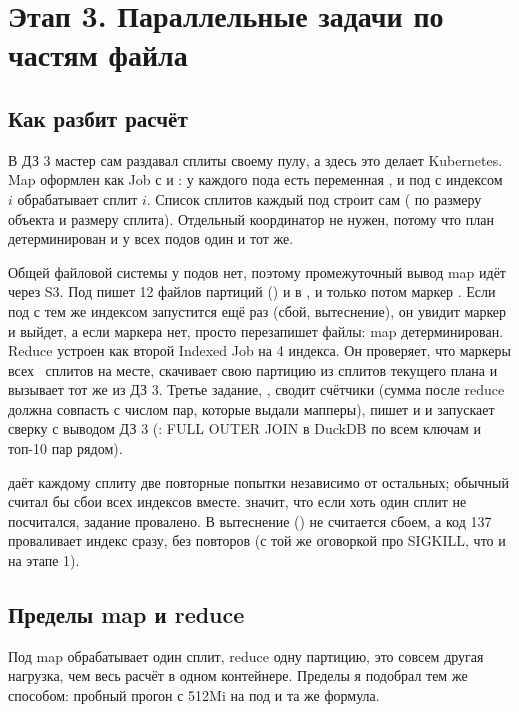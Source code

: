 \section{Этап 3. Параллельные задачи по частям файла}\label{sec:parallel}

\subsection{Как разбит расчёт}
В ДЗ 3 мастер сам раздавал сплиты своему пулу, а здесь это делает Kubernetes. Map оформлен как Job с  и : у каждого пода есть переменная , и под с индексом $i$ обрабатывает сплит $i$. Список сплитов каждый под строит сам ( по размеру объекта и размеру сплита). Отдельный координатор не нужен, потому что план детерминирован и у всех подов один и тот же.

Общей файловой системы у подов нет, поэтому промежуточный вывод map идёт через S3. Под пишет 12 файлов партиций () и  в , и только потом маркер . Если под с тем же индексом запустится ещё раз (сбой, вытеснение), он увидит маркер и выйдет, а если маркера нет, просто перезапишет файлы: map детерминирован. Reduce устроен как второй Indexed Job на 4 индекса. Он проверяет, что маркеры всех \splits\ сплитов на месте, скачивает свою партицию из сплитов текущего плана и вызывает тот же  из ДЗ 3. Третье задание, , сводит счётчики (сумма после reduce должна совпасть с числом пар, которые выдали мапперы), пишет  и  и запускает сверку с выводом ДЗ 3 (: FULL OUTER JOIN в DuckDB по всем ключам и топ-10 пар рядом).


 даёт каждому сплиту две повторные попытки независимо от остальных; обычный  считал бы сбои всех индексов вместе.  значит, что если хоть один сплит не посчитался, задание провалено. В  вытеснение () не считается сбоем, а код 137 проваливает индекс сразу, без повторов (с той же оговоркой про SIGKILL, что и на этапе 1).

\subsection{Пределы map и reduce}
Под map обрабатывает один сплит, reduce одну партицию, это совсем другая нагрузка, чем весь расчёт в одном контейнере. Пределы я подобрал тем же способом: пробный прогон с 512Mi на под и та же формула.


